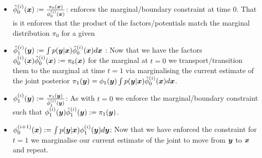 \documentclass[a4paper,12pt,twoside,openright]{report}
\theoremstyle{definition}
\begin{document}
\begin{itemize}
    \item ${\hat{\phi}}_0^{(i)}({\bm{x}}) := \frac{\pi_0({\bm{x}})}{\phi_0^{(i)}({\bm{x}})}$: enforces the marginal/boundary constraint at time $0$. That is it enforces that the product of the factors/potentials match the marginal distribution $\pi_0$ for a given 
    \item ${\hat{\phi}}_1^{(i)}({\bm{y}}) := \int  p({\bm{y}} | {\bm{x}}) {\hat{\phi}}_0^{(i)}({\bm{x}}) d{\bm{x}}$ : Now that we have the factors $\phi_0^{(i)}({\bm{x}}) {\hat{\phi}}_0^{(i)}({\bm{x}}) := {\pi_0({\bm{x}})}$ for the marginal at $t=0$ we transport/transition them to the marginal at time $t=1$ via marginalising the current estimate of the joint posterior $\pi_1({\bm{y}}) = \phi_1({\bm{y}}) \int p({\bm{y}}| {\bm{x}}) {\hat{\phi}}_0^{(i)}({\bm{x}}) d{\bm{x}}$.
    \item  $\phi_1^{(i)}({\bm{y}}) := \frac{\pi_1({\bm{y}})}{{\hat{\phi}}_1^{(i)}({\bm{y}})}$: As with $t=0$ we enforce the marginal/boundary  constraint such that  $\phi_1^{(i)}({\bm{y}}) {\hat{\phi}}_1^{(i)}({\bm{y}}) := {\pi_1({\bm{y}})}$. 
    \item $\phi^{(i+1)}_0({\bm{x}}) := \int  p({\bm{y}} | {\bm{x}}) \phi_1^{(i)}({\bm{y}}) d{\bm{y}}$; Now that we have enforced the constraint for $t=1$ we marginalise our current estimate of the joint to move from ${\bm{y}}$ to ${\bm{x}}$ and repeat.
\end{itemize}
\end{document}
